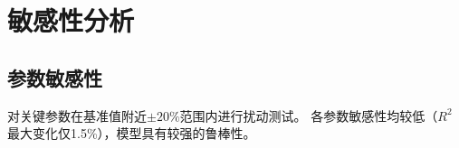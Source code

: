 \section{敏感性分析}
\subsection{参数敏感性}
对关键参数在基准值附近$\pm 20\%$范围内进行扰动测试。
各参数敏感性均较低（$R^2$最大变化仅1.5\%），模型具有较强的鲁棒性。
